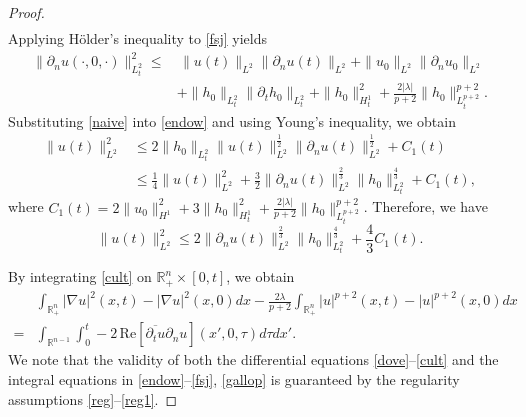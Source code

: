 \documentclass[preprint,compress,12pt]{elsarticle}
\numberwithin{equation}{section}
\begin{document}
\begin{proof}
\begin{equation}
\begin{aligned}
		\end{aligned}
	\end{equation}
	Applying H\"{o}lder's inequality to \eqref{fsj} yields
	\begin{equation}\label{naive}
		\begin{aligned}
			\|\partial_{n}u(\cdot,0,\cdot)\|_{L^{2}_{t}}^{2} \leq & \,\|u(t)\|_{L^{2}}\|\partial_{n}u
			(t)\|_{L^{2}}+\|u_{0}\|_{L^{2}}\|\partial_{n}u_{0}\|_{L^{2}}\\
			&+\|h_{0}\|_{L^{2}_{t}}\|\partial_{t}h_{0}\|_{L^{2}_{t}}+\|h_{0}\|_{H^{1}_{t}}^{2}+\frac{2|\lambda|}{p+2}\|h_{0}\|_{L^{p+2}_{t}}^{p+2}.		\end{aligned}	
	\end{equation}
	Substituting \eqref{naive} into \eqref{endow} and using Young's inequality, we obtain
	\begin{equation*}
		\begin{aligned}
			\|u(t)\|_{L^{2}}^{2}&\leq 2\|h_{0}\|_{L^{2}_{t}}\|u(t)\|_{L^2}^{\frac{1}{2}}\|\partial_{n}u(t)\|_{L^2}^{\frac{1}{2}}+C_{1}(t)\\
			&\leq\frac{1}{4}\|u(t)\|_{L^2}^{2}+\frac{3}{2}\|\partial_{n}u(t)\|_{L^2}^{\frac{2}{3}}\|h_{0}\|_{L^2_t}^{\frac{4}{3}}+C_{1}(t),
		\end{aligned}	
	\end{equation*}
	where $C_{1}(t)=2\|u_{0}\|_{H^{1}}^{2}+3\|h_{0}\|^{2}_{H^{1}_{t}}+\frac{2|\lambda|}{p+2}\|h_{0}\|_{L_{t}^{p+2}}^{p+2}$. Therefore, we have
	\begin{equation}\label{smite} \|u(t)\|_{L^2}^{2}\leq2\|\partial_{n}u(t)\|_{L^2}^{\frac{2}{3}}\|h_{0}\|_{L^2_t}^{\frac{4}{3}}+\frac{4}{3}C_{1}(t).
	\end{equation}
	
	By integrating \eqref{cult} on $\mathbb{R}^{n}_{+}\times[0,t]$, we obtain
	\begin{equation}\label{gallop}
		\begin{aligned} &\int_{\mathbb{R}^{n}_{+}}|\nabla u|^{2}(x,t)-|\nabla u|^{2}(x,0)dx-\frac{2\lambda}{p+2}\int_{\mathbb{R}^{n}_{+}}|u|^{p+2}(x,t)-|u|^{p+2}(x,0)dx\\	=&\int_{\mathbb{R}^{n-1}}\int_{0}^{t}-2\,\text{Re}[\overline
			{\partial_{t}u}\partial_{n}u](x',0,\tau)d\tau dx'.
		\end{aligned}
	\end{equation}
	We note that the validity of both the differential equations \eqref{dove}--\eqref{cult} and the integral equations in \eqref{endow}--\eqref{fsj}, \eqref{gallop} is guaranteed by the regularity assumptions \eqref{reg}--\eqref{reg1}.
	

\end{proof}
\end{document}
